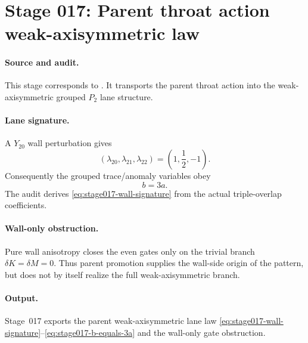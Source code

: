 \section[Stage 017]{Stage 017: Parent throat action weak-axisymmetric law}
\label{stage:017}


\paragraph{Source and audit.}
This stage corresponds to
.
It transports the parent throat action into the weak-axisymmetric grouped
\(P_2\) lane structure.

\paragraph{Lane signature.}
A \(Y_{20}\) wall perturbation gives
\begin{equation}
\label{eq:stage017-wall-signature}
(\lambda_{20},\lambda_{21},\lambda_{22})
=\left(1,\frac12,-1\right).
\end{equation}
Consequently the grouped trace/anomaly variables obey
\begin{equation}
\label{eq:stage017-b-equals-3a}
b=3a.
\end{equation}
The audit derives \eqref{eq:stage017-wall-signature} from the actual
triple-overlap coefficients.

\paragraph{Wall-only obstruction.}
Pure wall anisotropy closes the even gates only on the trivial branch
\(\delta K=\delta M=0\).  Thus parent promotion supplies the wall-side origin
of the pattern, but does not by itself realize the full weak-axisymmetric
branch.

\paragraph{Output.}
Stage~017 exports the parent weak-axisymmetric lane law
\eqref{eq:stage017-wall-signature}--\eqref{eq:stage017-b-equals-3a}
and the wall-only gate obstruction.
